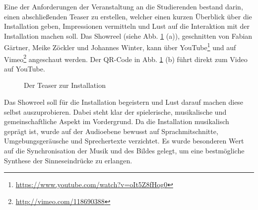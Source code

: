 
Eine der Anforderungen der Veranstaltung an die Studierenden bestand darin, einen abschließenden Teaser zu erstellen, welcher einen kurzen Überblick über die Installation geben, Impressionen vermitteln und Lust auf die Interaktion mit der Installation machen soll. Das Showreel (siehe Abb. \ref{fig:teaser} (a)), geschnitten von Fabian Gärtner, Meike Zöckler und Johannes Winter, kann über YouTube\footnote{\url{https://www.youtube.com/watch?v=oIt5Z8fHog0}} und auf Vimeo\footnote{\url{http://vimeo.com/118690388}} angeschaut werden. Der QR-Code in Abb. \ref{fig:teaser} (b) führt direkt zum Video auf YouTube.

\begin{figure}[htbp]
\hfill
{}
\caption{Der Teaser zur Installation}
\label{fig:teaser}
\end{figure}

Das Showreel soll für die Installation begeistern und Lust darauf machen diese selbst auszuprobieren. Dabei steht klar der spielerische, musikalische und gemeinschaftliche Aspekt im Vordergrund. Da die Installation musikalisch geprägt ist, wurde auf der Audioebene bewusst auf Sprachmitschnitte, Umgebungsgeräusche und Sprechertexte verzichtet. Es wurde besonderen Wert auf die Synchronisation der Musik und des Bildes gelegt, um eine bestmögliche Synthese der Sinneseindrücke zu erlangen.


